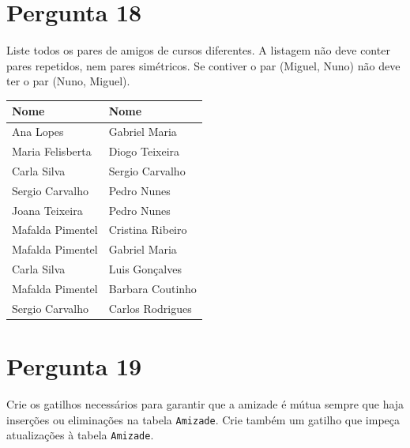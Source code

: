 \documentclass[type=recurso, year=2015/16]{bdad_exam}
\begin{document}
{\newpage
\section{Pergunta 18}
Liste todos os pares de amigos de cursos diferentes. A listagem não deve conter pares repetidos, nem pares simétricos. Se contiver o par (Miguel, Nuno) não deve ter o par (Nuno, Miguel).
\begin{center} \begin{tabular}{l l}
    \textbf{Nome}    & \textbf{Nome}    \\ \hline
    Ana Lopes        & Gabriel Maria    \\
    Maria Felisberta & Diogo Teixeira   \\
    Carla Silva      & Sergio Carvalho  \\
    Sergio Carvalho  & Pedro Nunes      \\
    Joana Teixeira   & Pedro Nunes      \\
    Mafalda Pimentel & Cristina Ribeiro \\
    Mafalda Pimentel & Gabriel Maria    \\
    Carla Silva      & Luis Gonçalves   \\
    Mafalda Pimentel & Barbara Coutinho \\
    Sergio Carvalho  & Carlos Rodrigues
\end{tabular} \end{center}


\section{Pergunta 19}
Crie os gatilhos necessários para garantir que a amizade é mútua sempre que haja inserções ou eliminações na tabela \texttt{Amizade}. Crie também um gatilho que impeça atualizações à tabela \texttt{Amizade}.


}
\end{document}
